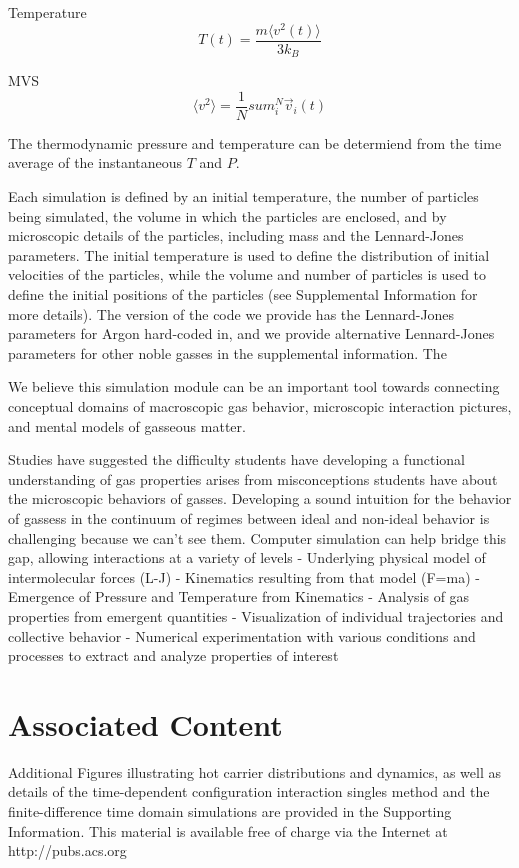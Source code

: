 \documentclass[journal=jpclcd,manuscript=article]{achemso}
\begin{document}
Temperature
\begin{equation}
T(t) = \frac{ m \langle v^2 (t) \rangle }{3 k_B}
\end{equation}

MVS
\begin{equation}
\langle v^2 \rangle = \frac{1}{N} sum_i^N \vec{v}_i(t)
\end{equation}

The thermodynamic pressure and temperature can be determiend from the time average of
the instantaneous $T$ and $P$.  

Each simulation is defined
by an initial temperature, the number of particles being simulated, the volume in which the particles are enclosed,
and by microscopic details of the particles, including mass and the Lennard-Jones parameters.  The initial temperature
is used to define the distribution of initial velocities of the particles, while the volume and number of particles is used
to define the initial positions of the particles (see Supplemental Information for more details).  The version of the code
we provide has the Lennard-Jones parameters for Argon%
hard-coded in, and we provide alternative Lennard-Jones parameters for other noble gasses in the supplemental information.
The

We believe this simulation module can be an important tool towards connecting conceptual domains of macroscopic gas behavior,
microscopic interaction pictures, and mental models of gasseous matter.

Studies have suggested the difficulty students have developing a functional understanding of gas properties
arises from misconceptions students have about the microscopic behaviors of gasses.
Developing a sound intuition for the behavior of gassess in the continuum of regimes between ideal and non-ideal
behavior is challenging because we can't see them.
Computer simulation can help bridge this gap, allowing interactions at a variety of levels
- Underlying physical model of intermolecular forces (L-J)
- Kinematics resulting from that model (F=ma)
- Emergence of Pressure and Temperature from Kinematics
- Analysis of gas properties from emergent quantities
- Visualization of individual trajectories and collective behavior
- Numerical experimentation with various conditions and processes to extract and analyze properties of interest




\section{Associated Content}
Additional Figures illustrating hot carrier distributions and dynamics, as well as details of the time-dependent
configuration interaction singles method and the finite-difference time domain simulations are provided in the Supporting 
Information.  This material is available free of charge via the Internet at http://pubs.acs.org
\end{document}
